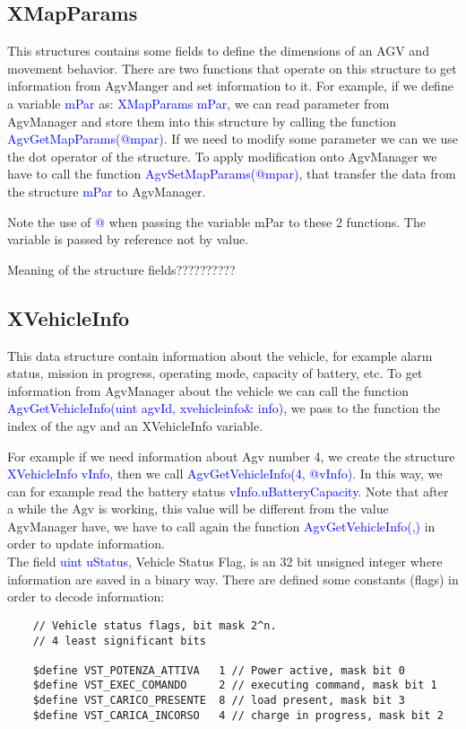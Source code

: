 %
\subsection{XMapParams}
This structures contains some fields to define the dimensions of an AGV and movement behavior. There are two functions that operate on this structure to get information from AgvManger and set information to it.
For example, if we define a variable \textcolor{blue}{mPar} as: \textcolor{blue}{XMapParams mPar}, we can read parameter from AgvManager and store them into this structure by calling the function \textcolor{blue}{AgvGetMapParams(@mpar)}.
If we need to modify some parameter we can we use the dot operator of the structure.
To apply modification onto AgvManager we have to call the function \textcolor{blue}{AgvSetMapParams(@mpar)}, that transfer the data from the structure \textcolor{blue}{mPar} to AgvManager.

Note the use of \textcolor{blue}{@} when passing the variable mPar to these 2 functions. The variable is passed by reference not by value.

Meaning of the structure fields??????????

%
\subsection{XVehicleInfo}
This data structure contain information about the vehicle, for example alarm status, mission in progress, operating mode, capacity of battery, etc.
To get information from AgvManager about the vehicle we can call the function \textcolor{blue}{AgvGetVehicleInfo(uint agvId, xvehicleinfo\& info)}, we pass to the function the index of the agv and an XVehicleInfo variable.

For example if we need information about Agv number 4, we create the structure \textcolor{blue}{XVehicleInfo vInfo}, then we call \textcolor{blue}{AgvGetVehicleInfo(4, @vInfo)}.
In this way, we can for example read the battery status \textcolor{blue}{vInfo.uBatteryCapacity}. Note that after a while the Agv is working, this value will be different from the value AgvManager have, we have to call again the function \textcolor{blue}{AgvGetVehicleInfo(,)} in order to update information.\\

The field \textcolor{blue}{uint uStatus}, Vehicle Status Flag,  is an 32 bit unsigned integer where information are saved in a binary way. There are defined some constants (flags) in order to decode information:
\begin{lstlisting}
	// Vehicle status flags, bit mask 2^n.
	// 4 least significant bits
	
	$define VST_POTENZA_ATTIVA   1 // Power active, mask bit 0
	$define VST_EXEC_COMANDO     2 // executing command, mask bit 1
	$define VST_CARICO_PRESENTE  8 // load present, mask bit 3
	$define VST_CARICA_INCORSO   4 // charge in progress, mask bit 2
\end{lstlisting}

